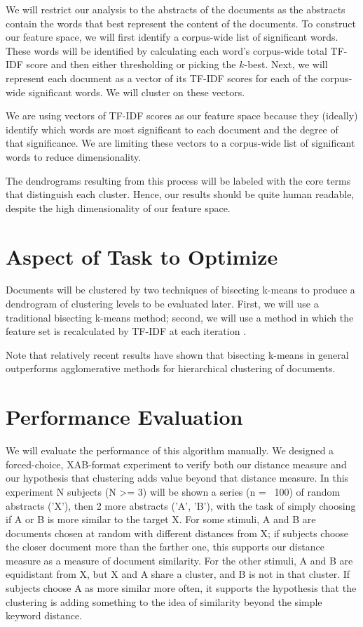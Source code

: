 \documentclass{acm_proc_article-sp}
\begin{document}
We will restrict our analysis to the abstracts of the documents as the abstracts contain the words that best represent the content of the documents. To construct our feature space, we will first identify a corpus-wide list of significant words. These words will be identified by calculating each word's corpus-wide total TF-IDF score and then either thresholding or picking the $k$-best. Next, we will represent each document as a vector of its TF-IDF scores for each of the corpus-wide significant words. We will cluster on these vectors.

We are using vectors of TF-IDF scores as our feature space because they (ideally) identify which words are most significant to each document and the degree of that significance. We are limiting these vectors to a corpus-wide list of significant words to reduce dimensionality.

The dendrograms resulting from this process will be labeled with the core terms that distinguish each cluster. Hence, our results should be quite human readable, despite the high dimensionality of our feature space.

\section{Aspect of Task to Optimize}
Documents will be clustered by two techniques of bisecting k-means to produce a dendrogram of clustering levels to be evaluated later. First, we will use a traditional bisecting k-means method; second, we will use a method in which the feature set is recalculated by TF-IDF at each iteration \cite{robertson2004} \cite{aizawa2003}.

Note that relatively recent results have shown that bisecting k-means in general outperforms agglomerative methods for hierarchical clustering of documents.\cite{steinbach2000}\cite{zhao2005}

\section{Performance Evaluation}
We will evaluate the performance of this algorithm manually. We designed a forced-choice, XAB-format experiment to verify both our distance measure and our hypothesis that clustering adds value beyond that distance measure. In this experiment N subjects (N >= 3) will be shown a series (n = ~100) of random abstracts ('X'), then 2 more abstracts ('A', 'B'), with the task of simply choosing if A or B is more similar to the target X. For some stimuli, A and B are documents chosen at random with different distances from X; if subjects choose the closer document more than the farther one, this supports our distance measure as a measure of document similarity. For the other stimuli, A and B are equidistant from X, but X and A share a cluster, and B is not in that cluster. If subjects choose A as more similar more often, it supports the hypothesis that the clustering is adding something to the idea of similarity beyond the simple keyword distance.
\end{document}
